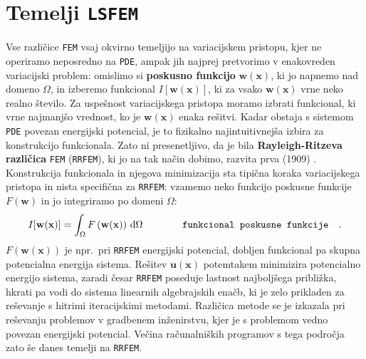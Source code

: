 \section{Temelji \texttt{LSFEM}}

Vse različice \texttt{FEM} vsaj okvirno temeljijo na variacijskem pristopu, kjer ne operiramo neposredno na \texttt{PDE}, ampak jih najprej pretvorimo v enakovreden variacijski problem: omislimo si \textbf{poskusno funkcijo} $\mathbf{w}(\mathbf{x})$, ki jo napnemo nad domeno $\Omega$, in izberemo funkcional $I[\mathbf{w}(\mathbf{x})]$, ki za vsako $\mathbf{w}(\mathbf{x})$ vrne neko realno število. Za uspešnost variacijskega pristopa moramo izbrati funkcional, ki vrne najmanjšo vrednost, ko je $\mathbf{w}(\mathbf{x})$ enaka rešitvi. Kadar obstaja s sistemom \texttt{PDE} povezan energijski potencial, je to fizikalno najintuitivnejša izbira za konstrukcijo funkcionala. Zato ni presenetljivo, da je bila \textbf{Rayleigh-Ritzeva različica} \texttt{FEM} (\texttt{RRFEM}), ki jo na tak način dobimo, razvita prva (1909) \cite{RitzW-Variationsprobleme}. Konstrukcija funkcionala in njegova minimizacija sta tipična koraka variacijskega pristopa in nista specifična za \texttt{RRFEM}: vzamemo neko funkcijo poskusne funkcije $F\left(\mathbf{w}\right)$ in jo integriramo po domeni $\Omega$:
\begin{equation}
	I[\mathbf{w(x)}] = \int_{\Omega} F\left(\mathbf{w(x)}\right) \, \mathrm{d} \Omega \hspace{1.4cm} \texttt{funkcional poskusne funkcije} \quad .
	\label{eq:GeneralFunctional}
\end{equation}
$F\left(\mathbf{w}(\mathbf{x})\right)$ je npr.\ pri \texttt{RRFEM} energijski potencial, dobljen funkcional pa skupna potencialna energija sistema. Rešitev $\mathbf{u}(\mathbf{x})$ potemtakem minimizira potencialno energijo sistema, zaradi česar \texttt{RRFEM} poseduje last\-nost najboljšega približka, hkrati pa vodi do sistema linearnih algebrajskih enačb, ki je zelo prikladen za reševanje s hitrimi iteracijskimi metodami. Različica metode se je izkazala pri reševanju problemov v gradbenem inženirstvu, kjer je s problemom vedno povezan energijski potencial. Večina računalniških programov s tega področja zato še danes temelji na \texttt{RRFEM}.

